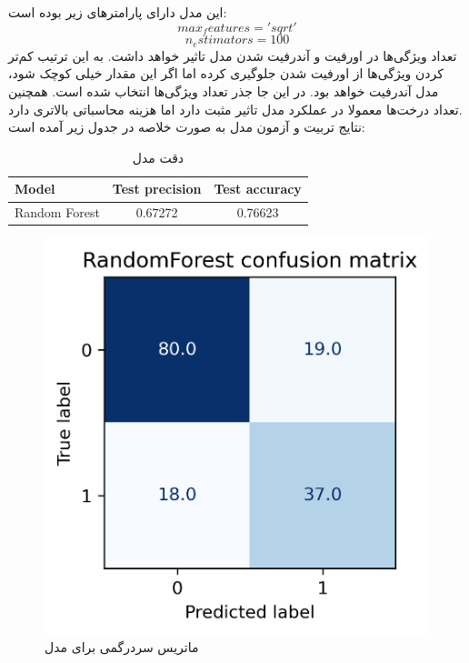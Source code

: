 \documentclass[11pt]{article}
\begin{document}
		\subsection{}
				این مدل دارای پارامترهای زیر بوده است:
		$$max_features = 'sqrt'$$
		$$n_estimators = 100$$
		تعداد ویژگی‌ها در اورفیت و آندرفیت شدن مدل تاثیر خواهد داشت. به این ترتیب کم‌تر کردن ویژگی‌ها از اورفیت شدن جلو‌گیری کرده اما اگر این مقدار خیلی کوچک شود، مدل آندرفیت خواهد بود. در این جا جذر تعداد ویژگی‌ها انتخاب شده است. همچنین تعداد درخت‌ها معمولا در عملکرد مدل تاثیر مثبت دارد اما هزینه محاسباتی بالاتری دارد.\\
		نتایج تربیت و آزمون مدل به صورت خلاصه در جدول زیر آمده است:
				\begin{table}[h!]
			\caption{دقت مدل }
			\begin{latin}
				\centering
				\begin{tabular}{|l|c|c|}
					\hline
					\textbf{Model} & \textbf{Test precision} & \textbf{Test accuracy} \\ \hline
					Random Forest & 0.67272 & 0.76623 \\ \hline
				\end{tabular}
			\end{latin}
			\label{tab:randomforest_results}
		\end{table}
		\begin{figure}[!h]
			\centerline{\includegraphics[width=0.5\linewidth]{../HW2_2/RandomForest confusion.png}}
			\caption{ماتریس سردرگمی برای مدل }
			\label{fig:confusion_randomforest}
		\end{figure}
		\pagebreak
\end{document}
